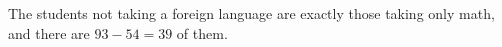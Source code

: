 The students not taking a foreign language are exactly those taking only math, and there are $93-54=\boxed{39}$ of them.
